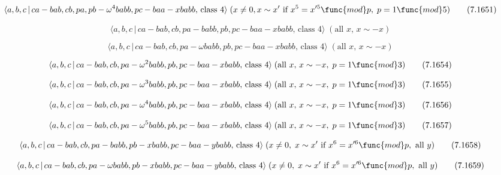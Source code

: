 \documentclass[10pt]{article}
\begin{document}
\begin{equation}
\langle a,b,c\,|\,ca-bab,cb,pa,pb-\omega ^{4}babb,pc-baa-xbabb,\,\text{class 
}4\rangle \;(x\neq 0,x \sim x^{\prime}\text{ if }x^5=x^{\prime 5}\func{mod}%
p,\;p=1\func{mod}5)  \tag{7.1651}
\end{equation}

\begin{equation}
\langle a,b,c\,|\,ca-bab,cb,pa-babb,pb,pc-baa-xbabb,\,\text{class }4\rangle
\;(\text{all }x,\,x\sim -x)  \tag{7.1652}
\end{equation}

\begin{equation}
\langle a,b,c\,|\,ca-bab,cb,pa-\omega babb,pb,pc-baa-xbabb,\,\text{class }%
4\rangle \;(\text{all }x,\,x\sim -x)  \tag{7.1653}
\end{equation}

\begin{equation}
\langle a,b,c\,|\,ca-bab,cb,pa-\omega ^{2}babb,pb,pc-baa-xbabb,\,\text{class 
}4\rangle \;(\text{all }x,\,x\sim -x,\;p=1\func{mod}3)  \tag{7.1654}
\end{equation}

\begin{equation}
\langle a,b,c\,|\,ca-bab,cb,pa-\omega ^{3}babb,pb,pc-baa-xbabb,\,\text{class 
}4\rangle \;(\text{all }x,\,x\sim -x,\;p=1\func{mod}3)  \tag{7.1655}
\end{equation}

\begin{equation}
\langle a,b,c\,|\,ca-bab,cb,pa-\omega ^{4}babb,pb,pc-baa-xbabb,\,\text{class 
}4\rangle \;(\text{all }x,\,x\sim -x,\;p=1\func{mod}3)  \tag{7.1656}
\end{equation}

\begin{equation}
\langle a,b,c\,|\,ca-bab,cb,pa-\omega ^{5}babb,pb,pc-baa-xbabb,\,\text{class 
}4\rangle \;(\text{all }x,\,x\sim -x,\;p=1\func{mod}3)  \tag{7.1657}
\end{equation}

\begin{equation}
\langle a,b,c\,|\,ca-bab,cb,pa-babb,pb-xbabb,pc-baa-ybabb,\,\text{class }%
4\rangle \;(x\neq 0,\;x\sim x^{\prime }\text{ if }x^{6}=x^{\prime 6}\func{mod%
}p,\text{ all }y)  \tag{7.1658}
\end{equation}

\begin{equation}
\langle a,b,c\,|\,ca-bab,cb,pa-\omega babb,pb-xbabb,pc-baa-ybabb,\,\text{%
class }4\rangle \;(x\neq 0,\;x\sim x^{\prime }\text{ if }x^{6}=x^{\prime 6}%
\func{mod}p,\text{ all }y)  \tag{7.1659}
\end{equation}
\end{document}
